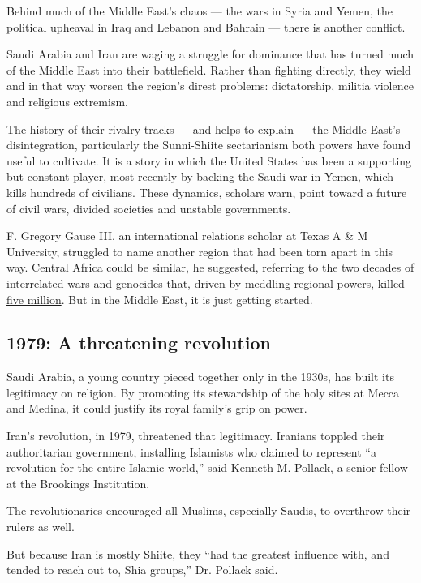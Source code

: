 Behind much of the Middle East's chaos --- the wars in Syria and Yemen,
the political upheaval in Iraq and Lebanon and Bahrain --- there is
another conflict.

Saudi Arabia and Iran are waging a struggle for dominance that has
turned much of the Middle East into their battlefield. Rather than
fighting directly, they wield and in that way worsen the region's direst
problems: dictatorship, militia violence and religious extremism.

The history of their rivalry tracks --- and helps to explain --- the
Middle East's disintegration, particularly the Sunni-Shiite sectarianism
both powers have found useful to cultivate. It is a story in which the
United States has been a supporting but constant player, most recently
by backing the Saudi war in Yemen, which kills hundreds of civilians.
These dynamics, scholars warn, point toward a future of civil wars,
divided societies and unstable governments.

F. Gregory Gause III, an international relations scholar at Texas A \& M
University, struggled to name another region that had been torn apart in
this way. Central Africa could be similar, he suggested, referring to
the two decades of interrelated wars and genocides that, driven by
meddling regional powers,
\href{http://www.nytimes.com/2012/12/16/sunday-review/congos-never-ending-war.html}{killed
five million}. But in the Middle East, it is just getting started.

\hypertarget{1979-a-threatening-revolution}{%
\subsection{1979: A threatening
revolution}\label{1979-a-threatening-revolution}}

Saudi Arabia, a young country pieced together only in the 1930s, has
built its legitimacy on religion. By promoting its stewardship of the
holy sites at Mecca and Medina, it could justify its royal family's grip
on power.

Iran's revolution, in 1979, threatened that legitimacy. Iranians toppled
their authoritarian government, installing Islamists who claimed to
represent ``a revolution for the entire Islamic world,'' said Kenneth M.
Pollack, a senior fellow at the Brookings Institution.

The revolutionaries encouraged all Muslims, especially Saudis, to
overthrow their rulers as well.

But because Iran is mostly Shiite, they ``had the greatest influence
with, and tended to reach out to, Shia groups,'' Dr. Pollack said.

